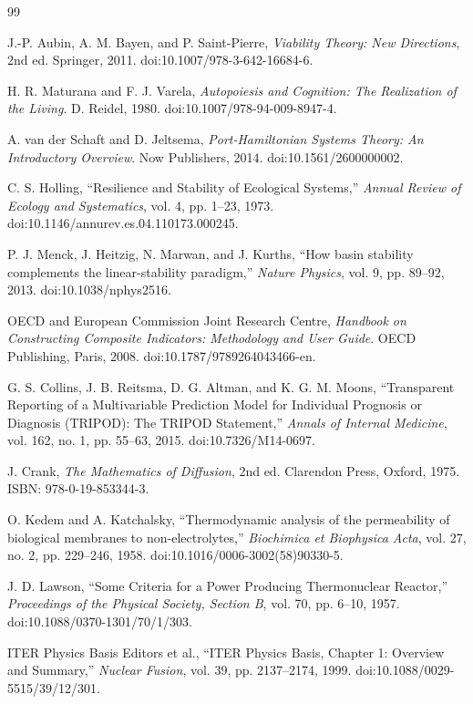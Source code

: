 \documentclass[11pt]{article}
\begin{document}
\begin{thebibliography}{99}

J.-P. Aubin, A. M. Bayen, and P. Saint-Pierre,
\emph{Viability Theory: New Directions}, 2nd ed.
Springer, 2011. doi:10.1007/978-3-642-16684-6.

H. R. Maturana and F. J. Varela,
\emph{Autopoiesis and Cognition: The Realization of the Living}.
D. Reidel, 1980. doi:10.1007/978-94-009-8947-4.

A. van der Schaft and D. Jeltsema,
\emph{Port-Hamiltonian Systems Theory: An Introductory Overview}.
Now Publishers, 2014. doi:10.1561/2600000002.

C. S. Holling,
``Resilience and Stability of Ecological Systems,''
\emph{Annual Review of Ecology and Systematics}, vol. 4, pp. 1--23, 1973.
doi:10.1146/annurev.es.04.110173.000245.

P. J. Menck, J. Heitzig, N. Marwan, and J. Kurths,
``How basin stability complements the linear-stability paradigm,''
\emph{Nature Physics}, vol. 9, pp. 89--92, 2013.
doi:10.1038/nphys2516.

OECD and European Commission Joint Research Centre,
\emph{Handbook on Constructing Composite Indicators: Methodology and User Guide}.
OECD Publishing, Paris, 2008. doi:10.1787/9789264043466-en.

G. S. Collins, J. B. Reitsma, D. G. Altman, and K. G. M. Moons,
``Transparent Reporting of a Multivariable Prediction Model for Individual Prognosis or Diagnosis (TRIPOD): The TRIPOD Statement,''
\emph{Annals of Internal Medicine}, vol. 162, no. 1, pp. 55--63, 2015.
doi:10.7326/M14-0697.

J. Crank, \emph{The Mathematics of Diffusion}, 2nd ed.
Clarendon Press, Oxford, 1975. ISBN: 978-0-19-853344-3.

O. Kedem and A. Katchalsky,
``Thermodynamic analysis of the permeability of biological membranes to non-electrolytes,''
\emph{Biochimica et Biophysica Acta}, vol. 27, no. 2, pp. 229--246, 1958.
doi:10.1016/0006-3002(58)90330-5.

J. D. Lawson,
``Some Criteria for a Power Producing Thermonuclear Reactor,''
\emph{Proceedings of the Physical Society, Section B}, vol. 70, pp. 6--10, 1957.
doi:10.1088/0370-1301/70/1/303.

ITER Physics Basis Editors et al.,
``ITER Physics Basis, Chapter 1: Overview and Summary,''
\emph{Nuclear Fusion}, vol. 39, pp. 2137--2174, 1999.
doi:10.1088/0029-5515/39/12/301.


\end{thebibliography}
\end{document}
